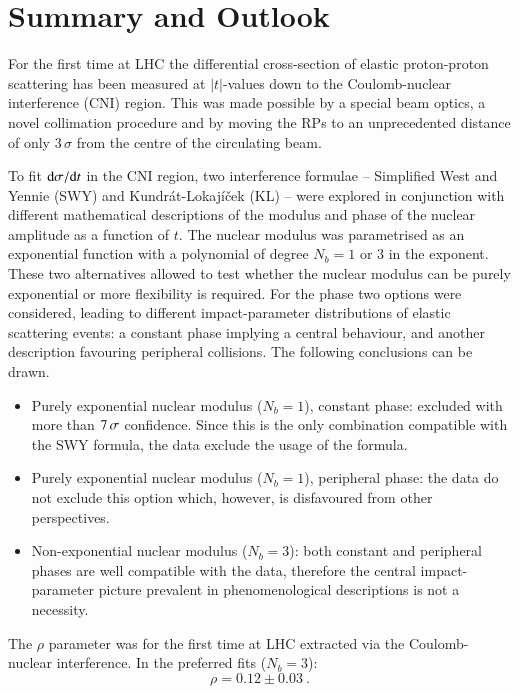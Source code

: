 \section{Summary and Outlook}
\label{sec:summary}
For the first time at LHC the differential cross-section of elastic proton-proton scattering has been measured at $|t|$-values down to the Coulomb-nuclear interference (CNI) region. This was made possible by a special beam optics, a novel collimation procedure and by moving the RPs to an unprecedented distance of only $3\,\sigma$ from the centre of the circulating beam.

To fit ${\rm d}\sigma/{\rm d} t$ in the CNI region, two interference formulae -- Simplified West and Yennie (SWY) and Kundr\' at-Lokaj\' i\v cek (KL) -- 
were explored in conjunction with different mathematical descriptions of the modulus and phase of the nuclear amplitude as a function of $t$. The nuclear modulus was parametrised as an exponential function with a polynomial of degree $N_b=1$ or $3$ in the exponent. These two alternatives allowed to test whether the nuclear modulus can be purely exponential or more flexibility is required. For the phase two options were considered, leading to different impact-parameter distributions of elastic scattering events: a constant phase implying a central behaviour, and another description favouring peripheral collisions. The following conclusions can be drawn.
\begin{itemize}
\item Purely exponential nuclear modulus ($N_b=1$), constant phase: excluded with more than $7\,{\rm \sigma}$ confidence. Since this is the only combination compatible with the SWY formula, the data exclude the usage of the formula.
\item Purely exponential nuclear modulus ($N_b=1$), peripheral phase: the data do not exclude this option which, however, is disfavoured from other perspectives.
\item Non-exponential nuclear modulus ($N_b=3$): both constant and peripheral phases are well compatible with the data, therefore the central impact-parameter picture prevalent in phenomenological descriptions is not a necessity.
\end{itemize}

The $\rho$ parameter was for the first time at LHC extracted via the Coulomb-nuclear interference. In the preferred fits ($N_b=3$):
\begin{equation}
\label{eq:rho final}
\rho = 0.12 \pm 0.03\ .
\end{equation}

